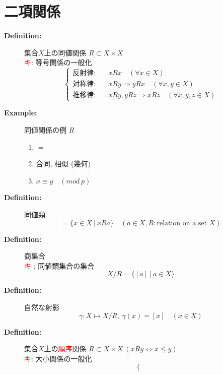 \documentclass[english,dvipdfmx]{jsarticle}
\newcommand*{\point}{\textcircled{\textcolor{red}{\scriptsize キ}}}
\begin{document}
\section{二項関係}
\begin{description}
    \item[\bf{Definition:}] 集合$X$上の同値関係 $R \subset X \times X$ \\
    \point : 等号関係の一般化
    \begin{equation*} \begin{cases}
        \text{反射律} : \quad &xRx \quad ( \forall x \in X )  \\
        \text{対称律} : \quad  &xRy \Rightarrow yRx \quad ( \forall x,y \in X ) \\
        \text{推移律} : \quad &xRy , yRz \Rightarrow xRz \quad (\forall x,y,z \in X )
    \end{cases} 
    \end{equation*}
    \item[\bf{Example:}] 同値関係の例 $R$
    \begin{enumerate}
        \item $ = $
        \item 合同, 相似 (幾何)
        \item $x \equiv y \quad (mod \ p)$
    \end{enumerate} 
    \item[\bf{Definition:}] 同値類
    \begin{equation*}  
        [a] = \{ x \in X \ | \ xRa \} \quad ( a \in X , R : \text{relation on a set } X )
    \end{equation*}
    \item[\bf{Definition:}] 商集合 \\
    \textcircled{\textcolor{red}{\scriptsize キ}} : 同値類集合の集合
    \begin{equation*} 
    X / R = \{ [a] \ | \ a \in X \} 
    \end{equation*}
    \item[\bf{Definition:}] 自然な射影
    \begin{equation*} 
    \gamma : X \longmapsto X / R ,\ \gamma(x) = [x] \quad ( x \in X )
    \end{equation*}
    \item[\bf{Definition:}] 集合$X$上の\textcolor{red}{順序}関係 $R \subset X \times X \ ( xRy \Leftrightarrow x\leq y)$ \\ 
    \point : 大小関係の一般化
    \begin{equation*}
    \begin{cases}

\end{cases}
\end{equation*}
\end{description}
\end{document}
